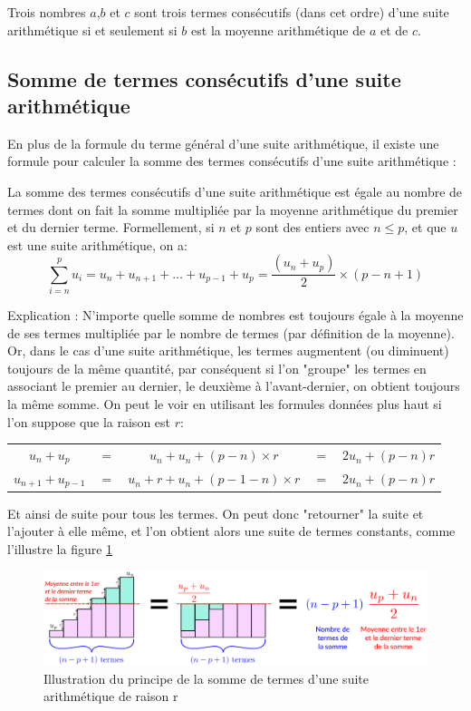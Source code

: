 \documentclass[10pt,a4paper]{book}
\begin{document}
\begin{prop}
    Trois nombres $a$,$b$ et $c$ sont trois termes consécutifs (dans cet ordre) d'une suite arithmétique si et seulement si $b$ est la moyenne arithmétique de $a$ et de $c$.
\end{prop}



\subsection{Somme de termes consécutifs d'une suite arithmétique}

En plus de la formule du terme général d'une suite arithmétique, il existe une formule pour calculer la somme des termes consécutifs d'une suite arithmétique :

\begin{prop}
    La somme des termes consécutifs d'une suite arithmétique est égale au nombre de termes dont on fait la somme multipliée par la moyenne arithmétique du premier et du dernier terme.
    Formellement, si $n$ et $p$ sont des entiers avec $n \leq p$, et que $u$ est une suite arithmétique, on a:
    \[  \sum_{i=n}^{p} u_i= u_n + u_{n+1} + \ldots  + u_{p-1} + u_p = \frac{(u_n+u_p)}{2} \times (p-n+1)
    \]
\end{prop}

Explication : N'importe quelle somme de nombres est toujours égale à la moyenne de ses termes multipliée par le nombre de termes (par définition de la moyenne). Or, dans le cas d'une suite arithmétique, les termes augmentent (ou diminuent) toujours de la même quantité, par conséquent si l'on "groupe" les termes en associant le premier au dernier, le deuxième à l'avant-dernier, on obtient toujours la même somme. On peut le voir en utilisant les formules données plus haut si l'on suppose que la raison est $r$:


\begin{tabular}{ccccc}
$u_n + u_p $&$=$ &$  u_n  +  u_n + (p-n) \times r $&$=$ & $ 2u_n + (p-n)r$ \\
$u_{n+1} + u_{p-1} $&$=$&$u_n + r  +  u_n + (p-1-n) \times r $&$=$&$2u_n + (p-n)r$
     & 
\end{tabular}

Et ainsi de suite pour tous les termes. On peut donc "retourner" la suite et l'ajouter à elle même, et l'on obtient alors une suite de termes constants, comme l'illustre la figure  \ref{fig:sumarith}

\begin{figure}[htbp]
\centering
\includegraphics[width=1.0\textwidth]{suites-arithmetiques-somme.png}
\caption{Illustration du principe de la somme de termes d'une suite arithmétique de raison r}
\label{fig:sumarith}
\end{figure}
\end{document}
